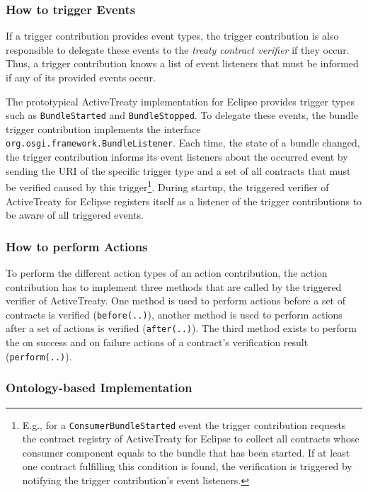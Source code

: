 \documentclass{llncs}
\begin{document}
\subsubsection{How to trigger Events}

If a trigger contribution provides event types, the trigger contribution is also responsible to delegate these events to the \textit{treaty contract verifier} if they occur. Thus, a trigger contribution knows a list of event listeners that must be informed if any of its provided events occur. 

The prototypical ActiveTreaty implementation for Eclipse provides trigger types such as \texttt{BundleStarted} and \texttt{BundleStopped}. To delegate these events, the bundle trigger contribution implements the interface \texttt{org.osgi.framework.Bun\-dle\-Lis\-te\-ner}. Each time, the state of a bundle changed, the trigger contribution informs its event listeners about the occurred event by sending the URI of the specific trigger type and a set of all contracts that must be verified caused by this trigger\footnote{E.g., for a \texttt{ConsumerBundleStarted} event the trigger contribution requests the contract registry of ActiveTreaty for Eclipse to collect all contracts whose consumer component equals to the bundle that has been started. If at least one contract fulfilling this condition is found, the verification is triggered by notifying the trigger contribution's event listeners.}. During startup, the triggered verifier of ActiveTreaty for Eclipse registers itself as a listener of the trigger contributions to be aware of all triggered events.

\subsubsection{How to perform Actions}

To perform the different action types of an action contribution, the action contribution has to implement three methods that are called by the triggered verifier of ActiveTreaty. One method is used to perform actions before a set of contracts is verified (\texttt{before(..)}), another method is used to perform actions after a set of actions is verified (\texttt{after(..)}). The third method exists to perform the on success and on failure actions of a contract's verification result (\texttt{perform(..)}).

\subsubsection{Ontology-based Implementation}
\end{document}
